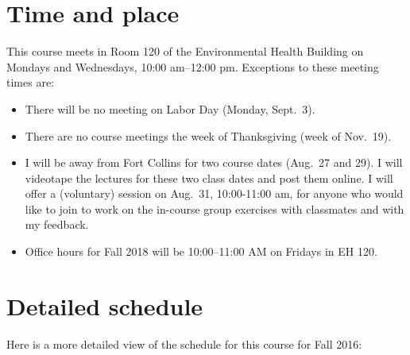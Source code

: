 \documentclass[]{book}
\providecommand{\tightlist}{%
  \setlength{\itemsep}{0pt}\setlength{\parskip}{0pt}}
\begin{document}
\hypertarget{time-and-place}{%
\section{Time and place}\label{time-and-place}}

This course meets in Room 120 of the Environmental Health Building on Mondays and Wednesdays, 10:00 am--12:00 pm. Exceptions to these meeting times are:

\begin{itemize}
\tightlist
\item
  There will be no meeting on Labor Day (Monday, Sept.~3).
\item
  There are no course meetings the week of Thanksgiving (week of Nov.~19).
\item
  I will be away from Fort Collins for two course dates (Aug.~27 and 29). I will videotape the lectures for these two class dates and post them online. I will offer a (voluntary) session on Aug.~31, 10:00-11:00 am, for anyone who would like to join to work on the in-course group exercises with classmates and with my feedback.
\item
  Office hours for Fall 2018 will be 10:00--11:00 AM on Fridays in EH 120.
\end{itemize}

\hypertarget{detailed-schedule}{%
\section{Detailed schedule}\label{detailed-schedule}}

Here is a more detailed view of the schedule for this course for Fall 2016:
\end{document}
